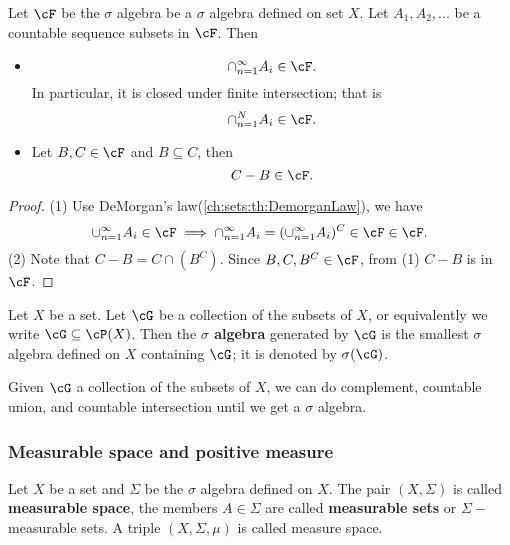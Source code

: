 \begin{refsection}
\begin{lemma}
Let $\cF$ be the $\sigma$ algebra be a $\sigma$ algebra defined on set $X$. Let $A_1,A_2,...$ be a countable sequence subsets in $\cF$. Then
\begin{itemize}
	\item $$\cap_{n=1}^\infty A_i \in \cF.$$	
	In particular, it is closed under finite intersection; that is
	$$\cap_{n=1}^N A_i \in \cF.$$
	\item Let $B,C\in \cF$ and $B\subseteq C$, then
	$$C - B \in \cF.$$
\end{itemize}
\end{lemma}
\begin{proof}
(1) Use DeMorgan's law(\autoref{ch:sets:th:DemorganLaw}), we have
$$\cup_{n=1}^\infty A_i \in \cF \implies \cap_{n=1}^\infty A_i = (\cup_{n=1}^\infty A_i)^C \in \cF\in \cF.$$
(2) Note that $C - B = C\cap(B^C)$. Since $B,C,B^C \in \cF$, from (1) 	$C - B$ is in $\cF$.
\end{proof}


\begin{definition}\cite[6]{cheng2008crash}
Let $X$ be a set. Let $\cG$ be a collection of the subsets of $X$, or equivalently we write $\cG \subseteq \cP(X)$. Then the \textbf{$\sigma$ algebra} generated by $\cG$ is the smallest $\sigma$ algebra defined on $X$ containing $\cG$; it is denoted by $\sigma(\cG)$.	
\end{definition}

\begin{remark}
Given $\cG$ a collection of the subsets of $X$, we can do complement, countable union, and countable intersection until we get a $\sigma$ algebra.	
\end{remark}



\subsubsection{Measurable space and positive measure}

\begin{definition}
Let $X$ be a set and $\Sigma$ be the $\sigma$ algebra defined on $X$. 	
The pair $(X,\Sigma)$ is called \textbf{measurable space}, the members  $A \in \Sigma$ are called \textbf{measurable sets} or $\Sigma-$measurable sets. A triple $(X,\Sigma,\mu)$ is called measure space.	
	

\end{definition}
\end{refsection}
